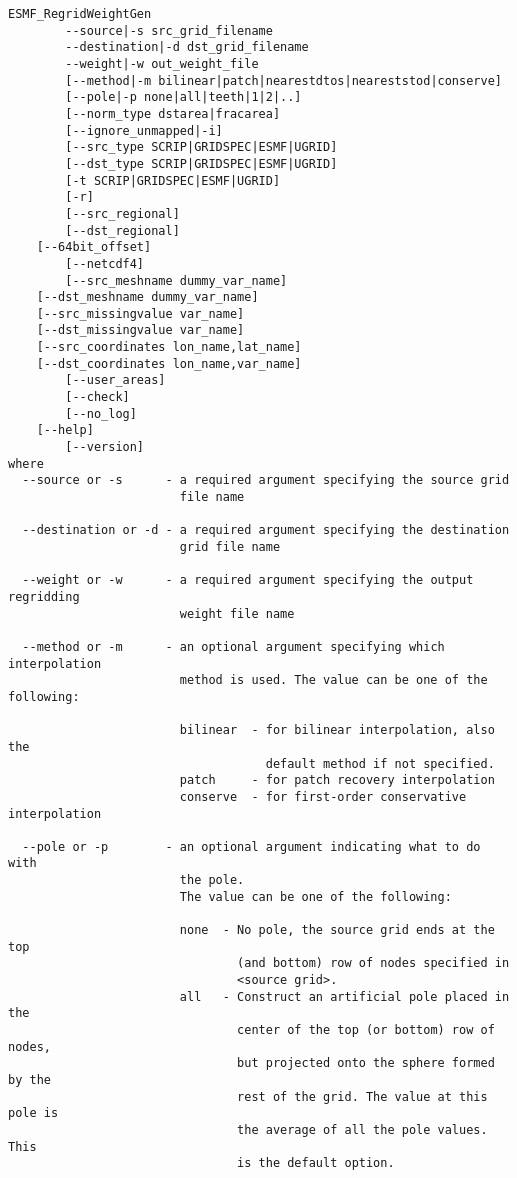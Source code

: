 \begin{verbatim}
ESMF_RegridWeightGen  
        --source|-s src_grid_filename
        --destination|-d dst_grid_filename
        --weight|-w out_weight_file
        [--method|-m bilinear|patch|nearestdtos|neareststod|conserve]
        [--pole|-p none|all|teeth|1|2|..]
        [--norm_type dstarea|fracarea]
        [--ignore_unmapped|-i]
        [--src_type SCRIP|GRIDSPEC|ESMF|UGRID]
        [--dst_type SCRIP|GRIDSPEC|ESMF|UGRID]
        [-t SCRIP|GRIDSPEC|ESMF|UGRID]
        [-r]
        [--src_regional]
        [--dst_regional]
	[--64bit_offset]
        [--netcdf4]
        [--src_meshname dummy_var_name]
	[--dst_meshname dummy_var_name]
	[--src_missingvalue var_name]
	[--dst_missingvalue var_name]
	[--src_coordinates lon_name,lat_name]
	[--dst_coordinates lon_name,var_name]
        [--user_areas]
        [--check]
        [--no_log]
	[--help]
        [--version]
where
  --source or -s      - a required argument specifying the source grid
                        file name

  --destination or -d - a required argument specifying the destination
                        grid file name

  --weight or -w      - a required argument specifying the output regridding
                        weight file name

  --method or -m      - an optional argument specifying which interpolation
                        method is used. The value can be one of the following:

                        bilinear  - for bilinear interpolation, also the
                                    default method if not specified.
                        patch     - for patch recovery interpolation
                        conserve  - for first-order conservative interpolation

  --pole or -p        - an optional argument indicating what to do with
                        the pole.
                        The value can be one of the following:

                        none  - No pole, the source grid ends at the top
                                (and bottom) row of nodes specified in
                                <source grid>.
                        all   - Construct an artificial pole placed in the
                                center of the top (or bottom) row of nodes,
                                but projected onto the sphere formed by the
                                rest of the grid. The value at this pole is
                                the average of all the pole values. This
                                is the default option.


\end{verbatim}
